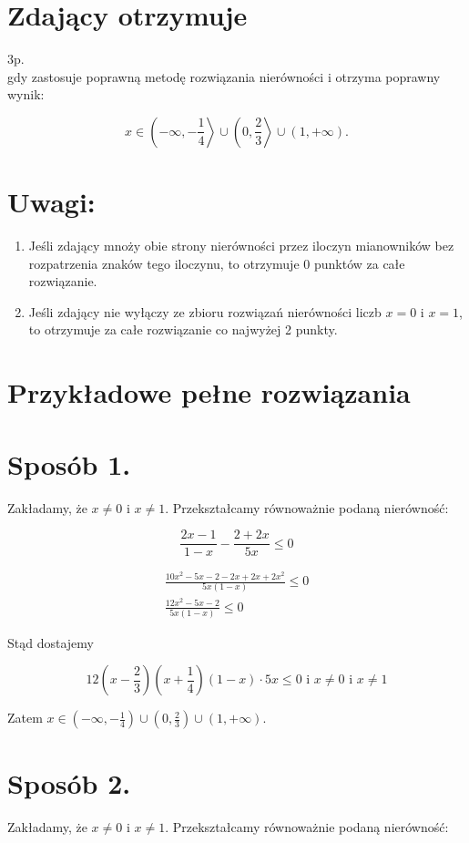 \documentclass[10pt]{article}
\begin{document}
\section*{Zdający otrzymuje}
3p.\\
gdy zastosuje poprawną metodę rozwiązania nierówności i otrzyma poprawny wynik:

$$
x \in\left(-\infty,-\frac{1}{4}\right\rangle \cup\left(0, \frac{2}{3}\right\rangle \cup(1,+\infty) .
$$

\section*{Uwagi:}
\begin{enumerate}
  \item Jeśli zdający mnoży obie strony nierówności przez iloczyn mianowników bez rozpatrzenia znaków tego iloczynu, to otrzymuje 0 punktów za całe rozwiązanie.
  \item Jeśli zdający nie wyłączy ze zbioru rozwiązań nierówności liczb $x=0$ i $x=1$, to otrzymuje za całe rozwiązanie co najwyżej 2 punkty.
\end{enumerate}

\section*{Przykładowe pełne rozwiązania}
\section*{Sposób 1.}
Zakładamy, że $x \neq 0$ i $x \neq 1$. Przekształcamy równoważnie podaną nierówność:

$$
\frac{2 x-1}{1-x}-\frac{2+2 x}{5 x} \leq 0
$$

$$
\begin{gathered}
\frac{10 x^{2}-5 x-2-2 x+2 x+2 x^{2}}{5 x(1-x)} \leq 0 \\
\frac{12 x^{2}-5 x-2}{5 x(1-x)} \leq 0
\end{gathered}
$$

Stąd dostajemy

$$
12\left(x-\frac{2}{3}\right)\left(x+\frac{1}{4}\right)(1-x) \cdot 5 x \leq 0 \text { i } x \neq 0 \text { i } x \neq 1
$$

Zatem $x \in\left(-\infty,-\frac{1}{4}\right) \cup\left(0, \frac{2}{3}\right) \cup(1,+\infty)$.

\section*{Sposób 2.}
Zakładamy, że $x \neq 0$ i $x \neq 1$. Przekształcamy równoważnie podaną nierówność:
\end{document}
